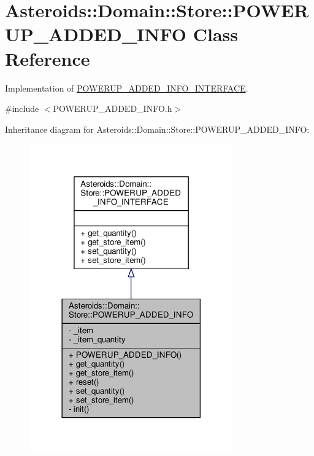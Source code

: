 \hypertarget{classAsteroids_1_1Domain_1_1Store_1_1POWERUP__ADDED__INFO}{}\section{Asteroids\+:\+:Domain\+:\+:Store\+:\+:P\+O\+W\+E\+R\+U\+P\+\_\+\+A\+D\+D\+E\+D\+\_\+\+I\+N\+FO Class Reference}
\label{classAsteroids_1_1Domain_1_1Store_1_1POWERUP__ADDED__INFO}


Implementation of \hyperlink{classAsteroids_1_1Domain_1_1Store_1_1POWERUP__ADDED__INFO__INTERFACE}{P\+O\+W\+E\+R\+U\+P\+\_\+\+A\+D\+D\+E\+D\+\_\+\+I\+N\+F\+O\+\_\+\+I\+N\+T\+E\+R\+F\+A\+CE}.  




{\ttfamily \#include $<$P\+O\+W\+E\+R\+U\+P\+\_\+\+A\+D\+D\+E\+D\+\_\+\+I\+N\+F\+O.\+h$>$}



Inheritance diagram for Asteroids\+:\+:Domain\+:\+:Store\+:\+:P\+O\+W\+E\+R\+U\+P\+\_\+\+A\+D\+D\+E\+D\+\_\+\+I\+N\+FO\+:\nopagebreak
\begin{figure}[H]
\begin{center}
\leavevmode
\includegraphics[width=249pt]{classAsteroids_1_1Domain_1_1Store_1_1POWERUP__ADDED__INFO__inherit__graph}
\end{center}
\end{figure}


